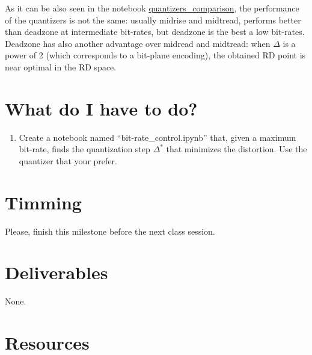 As it can be also seen in the notebook
\href{https://github.com/Sistemas-Multimedia/Sistemas-Multimedia.github.io/blob/master/contents/scalar_quantization/compare_quantizers.ipynb}{quantizers\_comparison},
the performance of the quantizers is not the same: usually midrise and
midtread, performs better than deadzone at intermediate bit-rates, but
deadzone is the best a low bit-rates. Deadzone has also another
advantage over midread and midtread: when $\Delta$ is a power of 2
(which corresponds to a bit-plane encoding), the obtained RD point is
near optimal in the RD space.



\section{What do I have to do?}

\begin{enumerate}
\item Create a notebook named ``bit-rate\_control.ipynb'' that, given
  a maximum bit-rate, finds the quantization step $\Delta^*$ that
  minimizes the distortion. Use the quantizer that your prefer.
\end{enumerate}


\section{Timming}

Please, finish this milestone before the next class session.

\section{Deliverables}

None.

\section{Resources}

\renewcommand{\addcontentsline}[3]{} %

